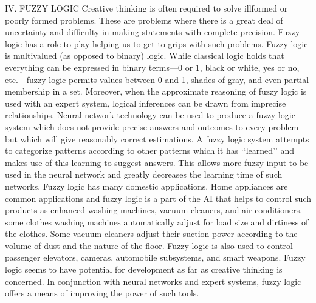 \documentclass[a4paper]{Thesis}
\begin{document}
IV. FUZZY LOGIC
Creative thinking is often required to solve illformed
or poorly formed problems. These are problems
where there is a great deal of uncertainty and difficulty
in making statements with complete precision.
Fuzzy logic has a role to play helping us to get to grips
with such problems. Fuzzy logic is multivalued (as opposed
to binary) logic. While classical logic holds that
everything can be expressed in binary terms—0 or 1,
black or white, yes or no, etc.—fuzzy logic permits
values between 0 and 1, shades of gray, and even partial
membership in a set. Moreover, when the approximate
reasoning of fuzzy logic is used with an expert
system, logical inferences can be drawn from imprecise
relationships.
Neural network technology can be used to produce
a fuzzy logic system which does not provide precise
answers and outcomes to every problem but which will
give reasonably correct estimations. A fuzzy logic system
attempts to categorize patterns according to other
patterns which it has ‘‘learned’’ and makes use of this
learning to suggest answers. This allows more fuzzy input
to be used in the neural network and greatly decreases
the learning time of such networks.
Fuzzy logic has many domestic applications. Home
appliances are common applications and fuzzy logic is
a part of the AI that helps to control such products as
enhanced washing machines, vacuum cleaners, and
air conditioners. some clothes washing machines automatically
adjust for load size and dirtiness of the
clothes. Some vacuum cleaners adjust their suction
power according to the volume of dust and the nature
of the floor. Fuzzy logic is also used to control passenger
elevators, cameras, automobile subsystems, and
smart weapons. Fuzzy logic seems to have potential for
development as far as creative thinking is concerned.
In conjunction with neural networks and expert systems,
fuzzy logic offers a means of improving the
power of such tools.
\end{document}
